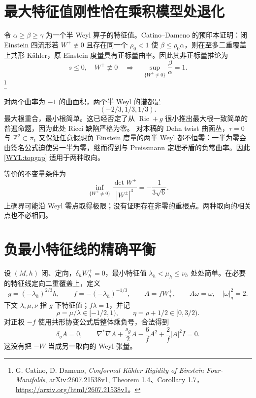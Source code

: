 \documentclass[UTF8,fontset=fandol,zihao=-4,oneside,openany]{ctexbook}
\theoremstyle{cjkplain}
\numberwithin{equation}{chapter}
\DeclareMathOperator{\Ric}{Ric}
\begin{document}
\section{最大特征值刚性恰在乘积模型处退化}
令 $\alpha\ge\beta\ge\gamma$ 为一个半 Weyl 算子的特征值。Catino--Dameno 的预印本证明：闭 Einstein 四流形若 $W^+\not\equiv0$ 且存在同一个 $\rho_0<1$ 使 $\beta\le\rho_0\alpha$，则在至多二重覆盖上共形 Kähler，原 Einstein 度量具有正标量曲率。因此其非正标量推论为
\begin{equation}\label{WYL:topgap}
s\le0,\quad W^+\not\equiv0
\quad\Longrightarrow\quad
\sup_{\{W^+\ne0\}}\frac{\beta}{\alpha}=1.
\end{equation}
\footnote{G. Catino, D. Dameno, \emph{Conformal Kähler Rigidity of Einstein Four-Manifolds}, arXiv:2607.21538v1, Theorem 1.4、Corollary 1.7，\url{https://arxiv.org/html/2607.21538v1}。}

对两个曲率为 $-1$ 的曲面积，两个半 Weyl 的谱都是
\[
(-2/3,1/3,1/3).
\]
最大根重合，最小根简单。这已经否定了从 $\Ric+g$ 很小推出最大根一致简单的普遍命题，因为此处 Ricci 缺陷严格为零。
对本稿的 Dehn twist 曲面丛，$\tau=0$ 与 $\mathbb Z^2\subset\pi_1$ 又保证任意假想负 Einstein 度量的两半 Weyl 都不恒零：一半为零会由签名公式迫使另一半为零，继而得到与 Preissmann 定理矛盾的负常曲率。因此 \eqref{WYL:topgap} 适用于两种取向。

等价的不变量条件为
\[
\inf_{\{W^\pm\ne0\}}\frac{\det W^\pm}{|W^\pm|^3}
=-\frac1{3\sqrt6}.
\]
上确界可能沿 Weyl 零点取得极限；没有证明存在非零的重根点。两种取向的相关点也不必相同。

\section{负最小特征线的精确平衡}
设 $(M,h)$ 闭、定向，$\delta_hW_h^+=0$，最小特征值 $\lambda_h<\mu_h\le\nu_h$ 处处简单。在必要的特征线定向二重覆盖上，定义
\begin{equation}\label{WYL:normalization}
g=(-\lambda_h)^{2/3}h,\qquad
f=-(-\lambda_h)^{-1/3},\qquad
A=fW_g^+,\qquad A\omega=\omega,\quad |\omega|_g^2=2.
\end{equation}
下文 $\lambda,\mu,\nu$ 指 $g$ 下特征值；$f\lambda=1$，并记
\[
\rho=\mu/\lambda\in[-1/2,1),\qquad
\eta=\rho+1/2\in[0,3/2).
\]
对正权 $-f$ 使用共形协变公式后整体乘负号，合法得到
\begin{equation}\label{WYL:weighted}
\delta_gA=0,\qquad
\nabla^*\nabla A+\frac{s_g}{2}A
-\frac6f A^2+\frac2f|A|^2I=0.
\end{equation}
这没有把 $-W$ 当成另一取向的 Weyl 张量。
\end{document}
